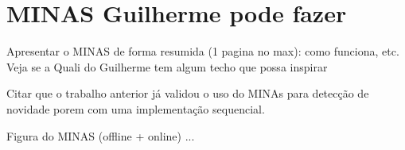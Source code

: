 \section{MINAS {\color{red} Guilherme pode fazer}}
\label{sec:minas}


Apresentar o MINAS de forma resumida (1 pagina no max): como funciona, etc. Veja se a Quali do Guilherme tem algum techo que possa inspirar 



Citar que o trabalho anterior já validou o uso do MINAs para detecção de novidade porem com uma implementação sequencial. 

Figura do MINAS (offline + online) ...

